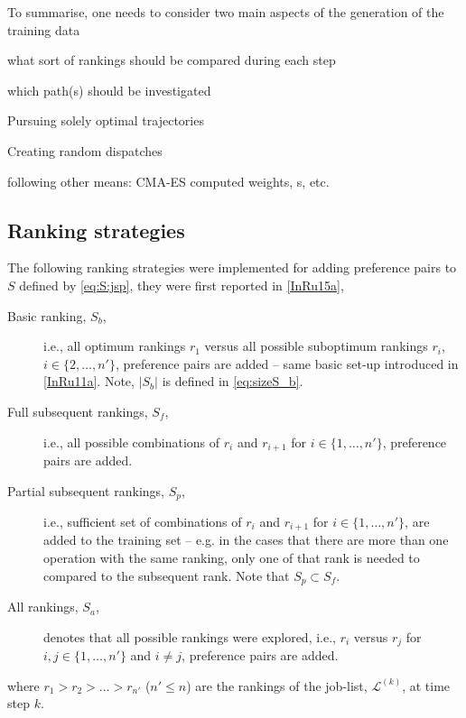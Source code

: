 To summarise, one needs to consider two main aspects of the generation of the 
training data
\begin{enumerate*}[label={\emph{\Roman*})},
    itemjoin={{? }}, itemjoin*={{? And }}, after={{}}]
    \item what sort of rankings should be compared during each step
    \item which path(s) should be investigated
    \begin{enumerate*}[label=\textit{\Roman{enumi}.\roman*)}, before={{? }},
        itemjoin={{? }}, itemjoin*={{? Or }}, after={{}}]
        \item Pursuing solely optimal trajectories
        \item Creating random dispatches
        \item following other means: CMA-ES computed weights, \sdr s, etc.
    \end{enumerate*}
\end{enumerate*}

\subsection{Ranking strategies}\label{sec:trdat:param:ranks}
The following ranking strategies were implemented for adding preference pairs 
to $S$ defined by \cref{eq:S:jsp}, they were first reported in \cref{InRu15a},
\begin{description}
    \item[Basic ranking, $S_b$,] i.e., all optimum rankings $r_1$ versus all 
    possible suboptimum rankings $r_i$, $i\in\{2,\ldots,n'\}$, preference pairs 
    are added -- same basic set-up introduced in \cref{InRu11a}. Note, $|S_b|$ 
    is defined in \cref{eq:sizeS_b}.
    \item[Full subsequent rankings, $S_f$,] i.e., all possible combinations of 
    $r_i$ and $r_{i+1}$ for $i\in\{1,\ldots,n'\}$, preference pairs are added.
    \item[Partial subsequent rankings, $S_p$,] i.e., sufficient set of 
    combinations of $r_i$ and $r_{i+1}$ for $i\in\{1,\ldots,n'\}$, are added to 
    the training set -- e.g. in the cases that there are more than one 
    operation with the same ranking, only one of that rank is needed to 
    compared to the subsequent rank. Note that $S_p\subset S_f$.
    \item[All rankings, $S_a$,] denotes that all possible rankings were 
    explored, i.e.,
    $r_i$ versus $r_j$ for $i,j\in\{1,\ldots,n'\}$ and $i\neq j$, preference 
    pairs are added.
\end{description}
where $r_1>r_2>\ldots>r_{n'}$ ($n'\leq n$) are the rankings of the job-list, 
$\mathcal{L}^{(k)}$, at time step $k$.


